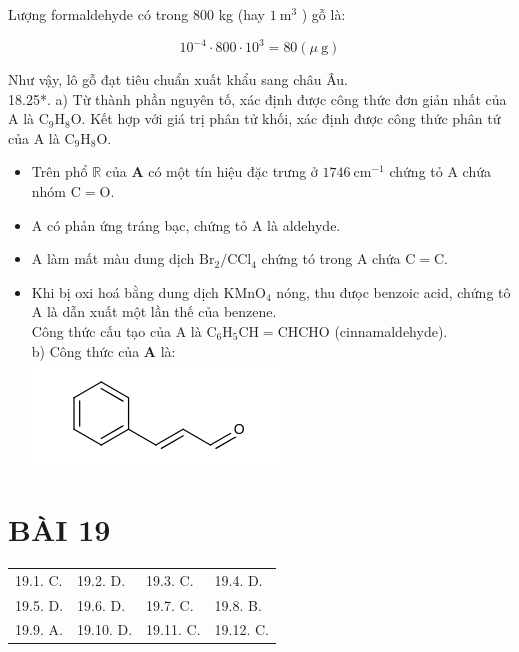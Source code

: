 \documentclass[10pt]{article}
\begin{document}
Lượng formaldehyde có trong 800 kg (hay $1 \mathrm{~m}^{3}$ ) gỗ là:

$$
10^{-4} \cdot 800 \cdot 10^{3}=80(\mu \mathrm{~g})
$$

Như vậy, lô gỗ đạt tiêu chuẩn xuất khẩu sang châu Âu.\\
18.25*. a) Từ thành phần nguyên tố, xác định được công thức đơn giản nhất của A là $\mathrm{C}_{9} \mathrm{H}_{8} \mathrm{O}$. Kết hợp với giá trị phân tử khối, xác định được công thức phân tứ của A là $\mathrm{C}_{9} \mathrm{H}_{8} \mathrm{O}$.

\begin{itemize}
  \item Trên phổ $\mathbb{R}$ của $\mathbf{A}$ có một tín hiệu đặc trưng ở $1746 \mathrm{~cm}^{-1}$ chứng tỏ A chứa nhóm $\mathrm{C}=\mathrm{O}$.
  \item A có phản ứng tráng bạc, chứng tỏ A là aldehyde.
  \item A làm mất màu dung dịch $\mathrm{Br}_{2} / \mathrm{CCl}_{4}$ chứng tó trong A chứa $\mathrm{C}=\mathrm{C}$.
  \item Khi bị oxi hoá bằng dung dịch $\mathrm{KMnO}_{4}$ nóng, thu đưọc benzoic acid, chứng tô A là dẫn xuất một lần thế của benzene.\\
Công thức cấu tạo của A là $\mathrm{C}_{6} \mathrm{H}_{5} \mathrm{CH}=\mathrm{CHCHO}$ (cinnamaldehyde).\\
b) Công thức của $\mathbf{A}$ là:\\
\includegraphics{smile-18406a036b1f8a4c5214b0b5cb02f93053ff2643}
\end{itemize}

\section*{BÀI 19}
\begin{center}
\begin{tabular}{llll}
19.1. C. & 19.2. D. & 19.3. C. & 19.4. D. \\
19.5. D. & 19.6. D. & 19.7. C. & 19.8. B. \\
19.9. A. & 19.10. D. & 19.11. C. & 19.12. C. \\
\end{tabular}
\end{center}
\end{document}
